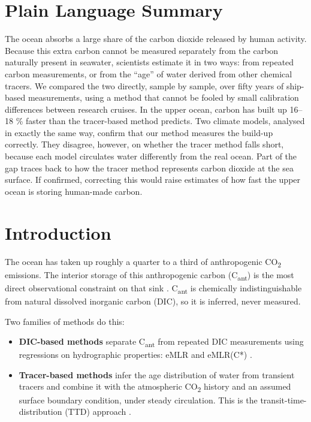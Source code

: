 \documentclass[11pt]{article}
\providecommand{\tightlist}{\setlength{\itemsep}{0pt}\setlength{\parskip}{0pt}}
\begin{document}
\section*{Plain Language Summary}\label{plain-language-summary}

The ocean absorbs a large share of the carbon dioxide released by human
activity. Because this extra carbon cannot be measured separately from
the carbon naturally present in seawater, scientists estimate it in two
ways: from repeated carbon measurements, or from the ``age'' of water
derived from other chemical tracers. We compared the two directly,
sample by sample, over fifty years of ship-based measurements, using a
method that cannot be fooled by small calibration differences between
research cruises. In the upper ocean, carbon has built up 16--18 \%
faster than the tracer-based method predicts. Two climate models,
analysed in exactly the same way, confirm that our method measures the
build-up correctly. They disagree, however, on whether the tracer method
falls short, because each model circulates water differently from the
real ocean. Part of the gap traces back to how the tracer method
represents carbon dioxide at the sea surface. If confirmed, correcting
this would raise estimates of how fast the upper ocean is storing
human-made carbon.

\section{Introduction}\label{introduction}

The ocean has taken up roughly a quarter to a third of anthropogenic
CO\textsubscript{2} emissions. The interior storage of this
anthropogenic carbon (C\textsubscript{ant}) is the most direct
observational constraint on that sink
\citep{Sabine2004, Gruber2019, Mueller2023}. C\textsubscript{ant} is
chemically indistinguishable from natural dissolved inorganic carbon
(DIC), so it is inferred, never measured.

Two families of methods do this:

\begin{itemize}
\tightlist
\item
  \textbf{DIC-based methods} separate C\textsubscript{ant} from repeated
  DIC measurements using regressions on hydrographic properties: eMLR
  and eMLR(C*) \citep{Friis2005, ClementGruber2018, Carter2017}.
\item
  \textbf{Tracer-based methods} infer the age distribution of water from
  transient tracers and combine it with the atmospheric
  CO\textsubscript{2} history and an assumed surface boundary condition,
  under steady circulation. This is the transit-time-distribution (TTD)
  approach \citep[e.g.,][]{Steinfeldt2024}.
\end{itemize}
\end{document}
